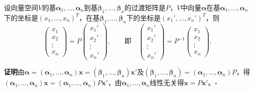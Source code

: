 \begin{theorem}[坐标变换公式]
设向量空间$V$的基$\boldsymbol{\alpha}_1,\dots,\boldsymbol{\alpha}_n$到基$\boldsymbol{\beta}_1,\dots,\boldsymbol{\beta}_n$的过渡矩阵是$P$，$V$中向量$\boldsymbol{\alpha}$在基$\boldsymbol{\alpha}_1,\dots,\boldsymbol{\alpha}_n$下的坐标是$(x_1,\dots,x_n)^{T}$，在基$\boldsymbol{\beta}_1,\dots,\boldsymbol{\beta}_n$下的坐标是$(x_1',\dots,x_n')^{T}$，则
\[
\begin{pmatrix}x_1\\x_2\\\vdots\\x_n\end{pmatrix}
=P
\begin{pmatrix}x_1'\\x_2'\\\vdots\\x_n'\end{pmatrix},
\qquad\text{即}\quad
\begin{pmatrix}x_1'\\x_2'\\\vdots\\x_n'\end{pmatrix}
=P^{-1}
\begin{pmatrix}x_1\\x_2\\\vdots\\x_n\end{pmatrix}.
\]
\end{theorem}

\textbf{证明}\quad 由$\boldsymbol{\alpha}=(\boldsymbol{\alpha}_1,\dots,\boldsymbol{\alpha}_n)\boldsymbol{x}=(\boldsymbol{\beta}_1,\dots,\boldsymbol{\beta}_n)\boldsymbol{x}'$及$(\boldsymbol{\beta}_1,\dots,\boldsymbol{\beta}_n)=(\boldsymbol{\alpha}_1,\dots,\boldsymbol{\alpha}_n)P$，得$(\boldsymbol{\alpha}_1,\dots,\boldsymbol{\alpha}_n)\boldsymbol{x}=(\boldsymbol{\alpha}_1,\dots,\boldsymbol{\alpha}_n)P\boldsymbol{x}'$，由$\boldsymbol{\alpha}_1,\dots,\boldsymbol{\alpha}_n$线性无关得$\boldsymbol{x}=P\boldsymbol{x}'$。\hfill$\square$





